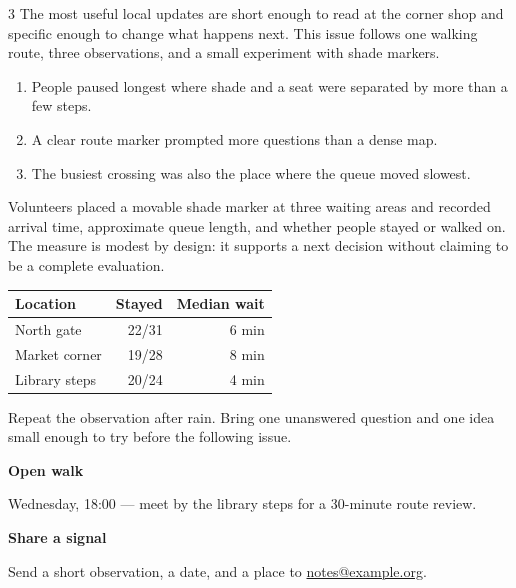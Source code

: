 \documentclass[10pt]{article}
\date{August 2026}
\begin{document}
\maketitle
\begin{multicols}{3}
The most useful local updates are short enough to read at the corner shop and
specific enough to change what happens next. This issue follows one walking
route, three observations, and a small experiment with shade markers.

\begin{enumerate}
  \item People paused longest where shade and a seat were separated by more than
        a few steps.
  \item A clear route marker prompted more questions than a dense map.
  \item The busiest crossing was also the place where the queue moved slowest.
\end{enumerate}

Volunteers placed a movable shade marker at three waiting areas and recorded
arrival time, approximate queue length, and whether people stayed or walked on.
The measure is modest by design: it supports a next decision without claiming
to be a complete evaluation.

\begin{center}
\begin{tabular}{@{}lrr@{}}\toprule
Location & Stayed & Median wait\\\midrule
North gate & 22/31 & 6 min\\
Market corner & 19/28 & 8 min\\
Library steps & 20/24 & 4 min\\\bottomrule
\end{tabular}
\end{center}

Repeat the observation after rain. Bring one unanswered question and one idea
small enough to try before the following issue.

\closearticle
{}
\textbf{Open walk}\par
Wednesday, 18:00 — meet by the library steps for a 30-minute route review.

\medskip\textbf{Share a signal}\par
Send a short observation, a date, and a place to
\href{mailto:notes@example.org}{notes@example.org}.
\end{multicols}
\end{document}
